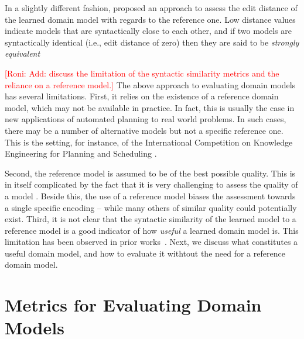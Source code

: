 \documentclass{article}
\theoremstyle{definition}
\theoremstyle{remark}
\newcommand{\roni}[1]{{\textcolor{red}{[Roni: #1]}}}
\newcommand{\mauro}[1]{{\textcolor{green}{[Mauro: #1]}}}
\begin{document}

In a slightly different fashion, \cite{chrpa2023comparing} proposed an approach to assess the edit distance of the learned domain model with regards to the reference one. Low distance values indicate models that are syntactically close to each other, and if two models are syntactically identical (i.e., edit distance of zero) then they are said to be \textit{strongly equivalent} \cite{chrpa2023comparing}



\roni{Add: discuss the limitation of the syntactic similarity metrics and the reliance on a reference model.}
The above approach to evaluating domain models has several limitations. 
First, it relies on the existence of a reference domain model, which may not be available in practice. 
In fact, this is usually the case in new applications of automated planning to real world problems. In such cases, there may be a number of alternative models but not a specific reference one. This is the setting, for instance, of the International Competition on Knowledge Engineering for Planning and Scheduling \citep{DBLP:journals/aim/ChrpaMVV17}.

Second, the reference model is assumed to be of the best possible quality. This is in itself complicated by the fact that it is very challenging to assess the quality of a model \cite{DBLP:conf/kcap/McCluskeyVV17}. Beside this, the use of a reference model biases the assessment towards a single specific encoding -- while many others of similar quality could potentially exist.  
Third, it is not clear that the syntactic similarity of the learned model to a reference model is a good indicator of how \emph{useful} a learned domain model is. This limitation has been observed in prior works~\cite{aineto2019learning,juba2021safe,mordoch2024safe}.
Next, we discuss what constitutes a useful domain model, and how to evaluate it withtout the need for a reference domain model.




\section{Metrics for Evaluating Domain Models}
\end{document}

